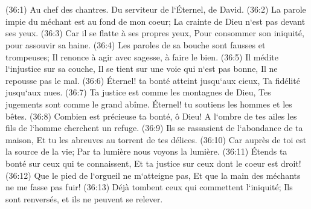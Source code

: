 \chapter{}

\verse (36:1) Au chef des chantres. Du serviteur de l`Éternel, de David. (36:2) La parole impie du méchant est au fond de mon coeur; La crainte de Dieu n`est pas devant ses yeux. 
\verse (36:3) Car il se flatte à ses propres yeux, Pour consommer son iniquité, pour assouvir sa haine. 
\verse (36:4) Les paroles de sa bouche sont fausses et trompeuses; Il renonce à agir avec sagesse, à faire le bien. 
\verse (36:5) Il médite l`injustice sur sa couche, Il se tient sur une voie qui n`est pas bonne, Il ne repousse pas le mal. 
\verse (36:6) Éternel! ta bonté atteint jusqu`aux cieux, Ta fidélité jusqu`aux nues. 
\verse (36:7) Ta justice est comme les montagnes de Dieu, Tes jugements sont comme le grand abîme. Éternel! tu soutiens les hommes et les bêtes. 
\verse (36:8) Combien est précieuse ta bonté, ô Dieu! A l`ombre de tes ailes les fils de l`homme cherchent un refuge. 
\verse (36:9) Ils se rassasient de l`abondance de ta maison, Et tu les abreuves au torrent de tes délices. 
\verse (36:10) Car auprès de toi est la source de la vie; Par ta lumière nous voyons la lumière. 
\verse (36:11) Étends ta bonté sur ceux qui te connaissent, Et ta justice sur ceux dont le coeur est droit! 
\verse (36:12) Que le pied de l`orgueil ne m`atteigne pas, Et que la main des méchants ne me fasse pas fuir! 
\verse (36:13) Déjà tombent ceux qui commettent l`iniquité; Ils sont renversés, et ils ne peuvent se relever. 

\chapter{}

